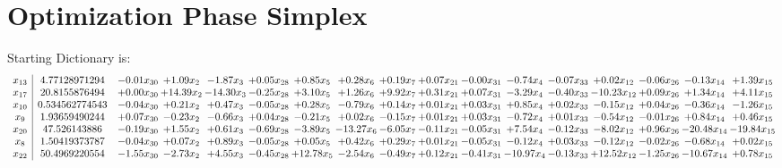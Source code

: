 \documentclass[9pt]{article}
\begin{document}
\section{Optimization Phase Simplex}
Starting Dictionary is:
\[\begin{array}{c| c c@{\hskip 2pt} c@{\hskip 2pt} c@{\hskip 2pt} c@{\hskip 2pt} c@{\hskip 2pt} c@{\hskip 2pt} c@{\hskip 2pt} c@{\hskip 2pt} c@{\hskip 2pt} c@{\hskip 2pt} c@{\hskip 2pt} c@{\hskip 2pt} c@{\hskip 2pt} c@{\hskip 2pt} c@{\hskip 2pt} }
 x_{13}   &  4.77128971294 & -0.01 x_{30} & +  1.09 x_{2} & -1.87 x_{3} & +  0.05 x_{28} & +  0.85 x_{5} & +  0.28 x_{6} & +  0.19 x_{7} & +  0.07 x_{21} & -0.00 x_{31} & -0.74 x_{4} & -0.07 x_{33} & +  0.02 x_{12} & -0.06 x_{26} & -0.13 x_{14} & +  1.39 x_{15}\\
 x_{17}   &  20.8155876494 & +  0.00 x_{30} & + 14.39 x_{2} & -14.30 x_{3} & -0.25 x_{28} & +  3.10 x_{5} & +  1.26 x_{6} & +  9.92 x_{7} & +  0.31 x_{21} & +  0.07 x_{31} & -3.29 x_{4} & -0.40 x_{33} & -10.23 x_{12} & +  0.09 x_{26} & +  1.34 x_{14} & +  4.11 x_{15}\\
 x_{10}   &  0.534562774543 & -0.04 x_{30} & +  0.21 x_{2} & +  0.47 x_{3} & -0.05 x_{28} & +  0.28 x_{5} & -0.79 x_{6} & +  0.14 x_{7} & +  0.01 x_{21} & +  0.03 x_{31} & +  0.85 x_{4} & +  0.02 x_{33} & -0.15 x_{12} & +  0.04 x_{26} & -0.36 x_{14} & -1.26 x_{15}\\
 x_{9}   &  1.93659490244 & +  0.07 x_{30} & -0.23 x_{2} & -0.66 x_{3} & +  0.04 x_{28} & -0.21 x_{5} & +  0.02 x_{6} & -0.15 x_{7} & +  0.01 x_{21} & +  0.03 x_{31} & -0.72 x_{4} & +  0.01 x_{33} & -0.54 x_{12} & -0.01 x_{26} & +  0.84 x_{14} & +  0.46 x_{15}\\
 x_{20}   &  47.526143886 & -0.19 x_{30} & +  1.55 x_{2} & +  0.61 x_{3} & -0.69 x_{28} & -3.89 x_{5} & -13.27 x_{6} & -6.05 x_{7} & -0.11 x_{21} & -0.05 x_{31} & +  7.54 x_{4} & -0.12 x_{33} & -8.02 x_{12} & +  0.96 x_{26} & -20.48 x_{14} & -19.84 x_{15}\\
 x_{8}   &  1.50419373787 & -0.04 x_{30} & +  0.07 x_{2} & +  0.89 x_{3} & -0.05 x_{28} & +  0.05 x_{5} & +  0.42 x_{6} & +  0.29 x_{7} & +  0.01 x_{21} & -0.05 x_{31} & -0.12 x_{4} & +  0.03 x_{33} & -0.12 x_{12} & -0.02 x_{26} & -0.68 x_{14} & +  0.02 x_{15}\\
 x_{22}   &  50.4969220554 & -1.55 x_{30} & -2.73 x_{2} & +  4.55 x_{3} & -0.45 x_{28} & + 12.78 x_{5} & -2.54 x_{6} & -0.49 x_{7} & +  0.12 x_{21} & -0.41 x_{31} & -10.97 x_{4} & -0.13 x_{33} & + 12.52 x_{12} & -1.25 x_{26} & -10.67 x_{14} & +  0.78 x_{15}\\

\end{array}\]
\end{document}
